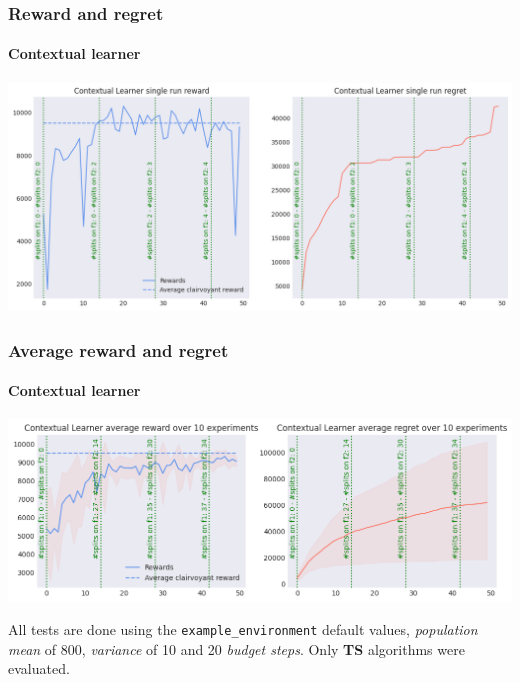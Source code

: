 \begin{frame}[plain]

\frametitle{Reward and regret}
\framesubtitle{Contextual learner}

\begin{center}
    \hspace*{-2.8em}
    \includegraphics[scale=0.43]{img/Graphs/context_generation/image1.png}
\end{center}

\end{frame}


\begin{frame}[plain]

\frametitle{Average reward and regret}
\framesubtitle{Contextual learner}

\begin{center}
    \hspace*{-2.8em}
    \includegraphics[scale=0.49]{img/Graphs/context_generation/image2.png}
\end{center}

\vspace*{2em}

\scriptsize All tests are done using the \texttt{example\_environment} default values, \textit{population mean} of 800, \textit{variance} of 10 and 20 \textit{budget steps}. Only \textbf{TS} algorithms were evaluated.

\end{frame}

